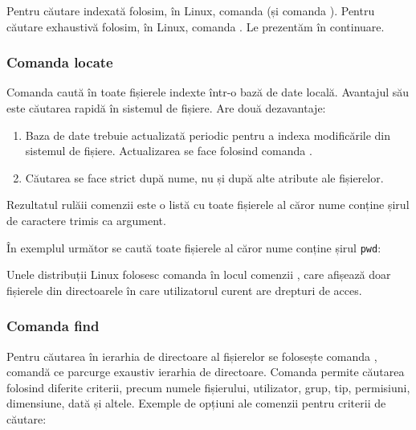 Pentru căutare indexată folosim, în Linux, comanda  (și comanda ). Pentru căutare exhaustivă folosim, în Linux, comanda . Le prezentăm în continuare.

\subsubsection{Comanda locate}
\label{sec:file-system-cmd-locate}

Comanda  caută în toate fișierele indexte într-o bază de date locală. Avantajul său este căutarea rapidă în sistemul de fișiere. Are două dezavantaje:
\begin{enumerate}
  \item Baza de date trebuie actualizată periodic pentru a indexa modificările din sistemul de fișiere. Actualizarea se face folosind comanda .
  \item Căutarea se face strict după nume, nu și după alte atribute ale fișierelor.
\end{enumerate}

Rezultatul rulăii comenzii este o listă cu toate fișierele al căror nume conține șirul de caractere trimis ca argument.

În exemplul următor se caută toate fișierele al căror nume conține șirul \texttt{pwd}:


Unele distribuții Linux folosesc comanda  în locul comenzii , care afișează doar fișierele din directoarele în care utilizatorul curent are drepturi de acces.

\subsubsection{Comanda find}
\label{sec:file-system-cmd-find}

Pentru căutarea în ierarhia de directoare al fișierelor se folosește comanda
, comandă ce parcurge exaustiv ierarhia de directoare. Comanda permite căutarea folosind
diferite criterii, precum numele fișierului, utilizator, grup, tip, permisiuni,
dimensiune, dată și altele. Exemple de opțiuni ale comenzii  pentru criterii de căutare:

